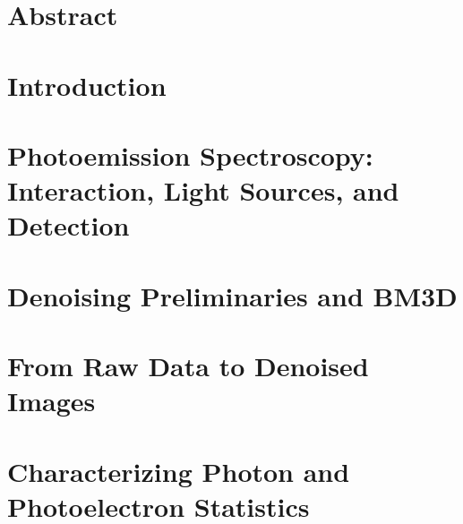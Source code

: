 \documentclass[a4paper,11pt,twoside,openany]{book}
\begin{document}

\chapter*{Abstract}

\tableofcontents

\printglossary[style=tree, type=\acronymtype, title=List of Acronyms]
\glsaddallunused[symbols]
\printglossary[type=symbols, style=tree, title=List of Symbols, nonumberlist]

\printglossary[nonumberlist]
\glsunsetall
\glsresetall

% 

\chapter{Introduction}


\chapter[Photoemission Spectroscopy: Interaction, Light Sources, and Detection]{Photoemission Spectroscopy:\\Interaction, Light Sources, and Detection}\label{ch:pes}


\chapter{Denoising Preliminaries and BM3D}\label{ch:denoising}


\chapter{From Raw Data to Denoised Images}\label{ch:datasets_bm3d}


\chapter{Characterizing Photon and Photoelectron Statistics}\label{ch:pes-statistics}

\end{document}
